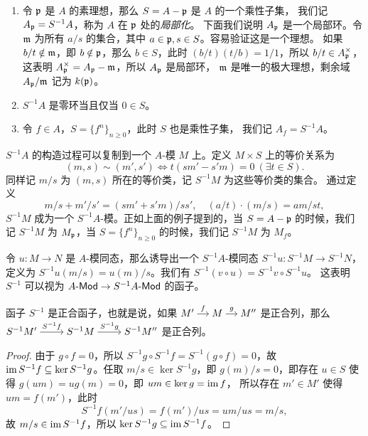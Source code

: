 \begin{example}
  \mbox{}
  \begin{enumerate}
    \item 
    令 $\mathfrak{p}$ 是 $A$ 的素理想，那么 $S=A-\mathfrak{p}$ 是 $A$ 的一个乘性子集，
    我们记 $A_{\mathfrak{p}}=S^{-1}A$，称为 $A$ 在 $\mathfrak{p}$ 处的\emph{局部化}。
    下面我们说明 $A_{\mathfrak{p}}$ 是一个局部环。令 $\mathfrak{m}$ 为所有
    $a/s$ 的集合，其中 $a\in\mathfrak{p},s\in S$。容易验证这是一个理想。
    如果 $b/t\notin\mathfrak{m}$，即 $b\notin\mathfrak{p}$，那么 $b\in S$，此时
    $(b/t)(t/b)=1/1$，所以 $b/t\in A_{\mathfrak{p}}^\times $，这表明
    $A_{\mathfrak{p}}^\times=A_{\mathfrak{p}}-\mathfrak{m}$，所以 $A_{\mathfrak{p}}$ 是局部环，
    $\mathfrak{m}$ 是唯一的极大理想，剩余域 $A_{\mathfrak{p}}/\mathfrak{m}$ 记为 $k(\mathfrak{p})$。
    \item $S^{-1}A$ 是零环当且仅当 $0\in S$。
    \item 令 $f\in A$，$S=\{f^n\}_{n\geq 0}$，此时 $S$ 也是乘性子集，
    我们记 $A_f=S^{-1}A$。
  \end{enumerate}
\end{example}

$S^{-1}A$ 的构造过程可以复制到一个 $A$-模 $M$ 上。定义 $M\times S$ 上的等价关系为
\[
  (m,s)\sim (m',s')\Longleftrightarrow  t(sm'-s'm)=0\ (\exists t\in S).
\]
同样记 $m/s$ 为 $(m,s)$ 所在的等价类，记 $S^{-1}M$ 为这些等价类的集合。
通过定义
\[
  m/s+m'/s'=(sm'+s'm)/ss',\quad (a/t)\cdot (m/s)=am/st,  
\]
$S^{-1}M$ 成为一个 $S^{-1}A$-模。正如上面的例子提到的，当 $S=A-\mathfrak{p}$
的时候，我们记 $S^{-1}M$ 为 $M_{\mathfrak{p}}$，当 $S=\{f^n\}_{n\geq 0}$
的时候，我们记 $S^{-1}M$ 为 $M_f$。

令 $u:M\to N$ 是 $A$-模同态，那么诱导出一个 $S^{-1}A$-模同态 $S^{-1}u:S^{-1}M\to S^{-1}N$，
定义为 $S^{-1}u(m/s)=u(m)/s$。我们有 $S^{-1}(v\circ u)=S^{-1}v\circ S^{-1}u$。
这表明 $S^{-1}$ 可以视为 $\text{$A$-\textsf{Mod}}\to \text{$S^{-1}A$-\textsf{Mod}}$ 的函子。

\begin{proposition}\label{prop:fraction is exact}
  函子 $S^{-1}$ 是正合函子，也就是说，如果
  $
    \begin{tikzcd}[cramped,column sep=small]
      M'\arrow[r,"f"] & M\arrow[r,"g"] & M''
    \end{tikzcd}
  $
  是正合列，那么
  $
    \begin{tikzcd}[cramped]
      S^{-1}M'\arrow[r,"S^{-1}f"] & S^{-1}M\arrow[r,"S^{-1}g"] & S^{-1}M''
    \end{tikzcd}
  $
  是正合列。
\end{proposition}
\begin{proof}
  由于 $g\circ f =0$，所以 $S^{-1}g\circ S^{-1}f=S^{-1}(g\circ f)=0$，故
  $\operatorname{im} S^{-1}f\subseteq\ker S^{-1}g$。任取 $m/s\in \ker S^{-1}g$，即
  $g(m)/s=0$，即存在 $u\in S$ 使得 $g(um)=ug(m)=0$，即 $um\in\ker g=\operatorname{im} f$，
  所以存在 $m'\in M'$ 使得 $um=f(m')$，此时
  \[
    S^{-1}f(m'/us)=f(m')/us=um/us=m/s,  
  \]
  故 $m/s\in\operatorname{im} S^{-1}f$，所以 $\ker S^{-1}g\subseteq \operatorname{im} S^{-1}f$。
\end{proof}

